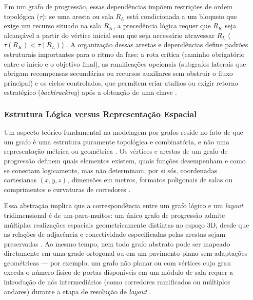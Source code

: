 Em um grafo de progressão, essas dependências impõem restrições de ordem topológica ($\tau$): se uma aresta ou sala $R_L$ está condicionada a um bloqueio que exige um recurso situado na sala $R_K$, a precedência lógica requer que $R_K$ seja alcançável a partir do vértice inicial sem que seja necessário atravessar $R_L$ ($\tau(R_K) < \tau(R_L)$) \cite{xu2025databasedrivenframework3dlevel}. A organização dessas arestas e dependências define padrões estruturais importantes para o ritmo da fase: a rota crítica (caminho obrigatório entre o início e o objetivo final), as ramificações opcionais (subgrafos laterais que abrigam recompensas secundárias ou recursos auxiliares sem obstruir o fluxo principal) e os ciclos controlados, que permitem criar atalhos ou exigir retorno estratégico (\textit{backtracking}) após a obtenção de uma chave \cite{dormans2010, inproceedings, linden2014dungeons}.

\subsubsection{Estrutura Lógica versus Representação Espacial}
\label{sec:logica_vs_espacial}

Um aspecto teórico fundamental na modelagem por grafos reside no fato de que um grafo é uma estrutura puramente topológica e combinatória, e não uma representação métrica ou geométrica \cite{dormans2010, summerville2018procedural}. Os vértices e arestas de um grafo de progressão definem quais elementos existem, quais funções desempenham e como se conectam logicamente, mas não determinam, por si sós, coordenadas cartesianas $(x, y, z)$, dimensões em metros, formatos poligonais de salas ou comprimentos e curvaturas de corredores \cite{dormans2010, inproceedings, linden2014dungeons, summerville2018procedural}.

Essa abstração implica que a correspondência entre um grafo lógico e um \textit{layout} tridimensional é de um-para-muitos: um único grafo de progressão admite múltiplas realizações espaciais geometricamente distintas no espaço 3D, desde que as relações de adjacência e conectividade especificadas pelas arestas sejam preservadas \cite{dormans2010, inproceedings}. Ao mesmo tempo, nem todo grafo abstrato pode ser mapeado diretamente em uma grade ortogonal ou em um pavimento plano sem adaptações geométricas --- por exemplo, um grafo não planar ou com vértices cujo grau exceda o número físico de portas disponíveis em um módulo de sala requer a introdução de nós intermediários (como corredores ramificados ou múltiplos andares) durante a etapa de resolução de \textit{layout} \cite{inproceedings, linden2014dungeons, xu2025databasedrivenframework3dlevel}.

